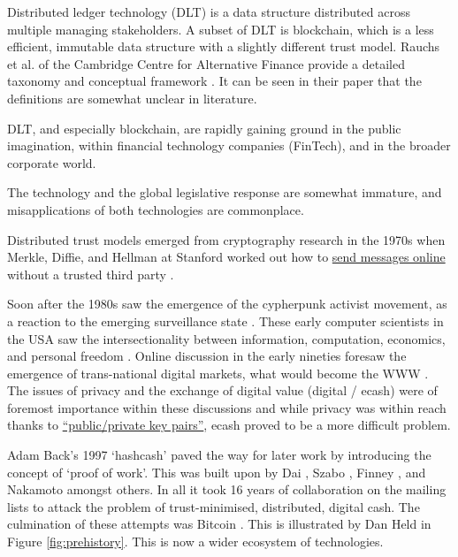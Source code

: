 Distributed ledger technology (DLT) is a data structure distributed across multiple managing stakeholders. A subset of DLT is blockchain, which is a less efficient, immutable data structure with a slightly different trust model. Rauchs et al. of the Cambridge Centre for Alternative Finance provide a detailed taxonomy and conceptual framework \cite{rauchs2018distributed}. It can be seen in their paper that the definitions are somewhat unclear in literature.\par
DLT, and especially blockchain, are rapidly gaining ground in the public imagination, within financial technology companies (FinTech), and in the broader corporate world. \par
The technology and the global legislative response are somewhat immature, and misapplications of both technologies are commonplace. \par
Distributed trust models emerged from cryptography research in the 1970s when Merkle, Diffie, and Hellman at Stanford worked out how to \href{https://medium.com/swlh/understanding-ec-diffie-hellman-9c07be338d4a}{send messages online} without a trusted third party \cite{diffie1976new,merkle1978secure}.\par
Soon after the 1980s saw the emergence of the cypherpunk activist movement, as a reaction to the emerging surveillance state \cite{burnham1983rise, chaum1985security}. These early computer scientists in the USA saw the intersectionality between information, computation, economics, and personal freedom \cite{lavoie1990prefatory}. Online discussion in the early nineties foresaw the emergence of trans-national digital markets, what would become the WWW \cite{salinCosts, cypherPunkMailList}. The issues of privacy %
 and the exchange of digital value (digital / ecash) %
 were of foremost importance within these discussions %
 and while privacy was within reach thanks to \href{https://www.openpgp.org/about/history/}{``public/private key pairs''}, 
 ecash proved to be a more difficult problem. \par
Adam Back's 1997 `hashcash' \cite{back2002hashcash} paved the way for later work by introducing the concept of `proof of work'. This was built upon by Dai \cite{dai1998b}, Szabo \cite{szabo1997formalizing}, Finney \cite{callas1998openpgp}, and Nakamoto amongst others. In all it took 16 years of collaboration on the mailing lists to attack the problem of trust-minimised, distributed, digital cash. The culmination of these attempts was Bitcoin \cite{Nakamoto2008}. This is illustrated by Dan Held in Figure \ref{fig:prehistory}. This is now a wider ecosystem of technologies. 

